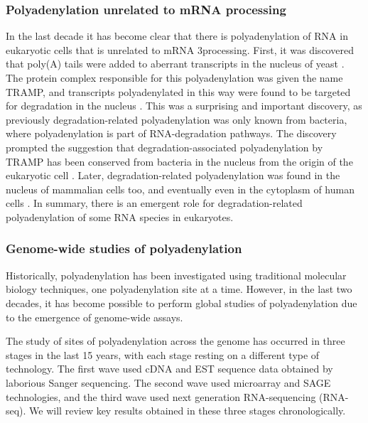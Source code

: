 \subsubsection{Polyadenylation unrelated to mRNA processing}
In the last decade it has become clear that there is polyadenylation of RNA in
eukaryotic cells that is unrelated to mRNA 3\ppp processing. First, it was
discovered that poly(A) tails were added to aberrant transcripts in the nucleus
of yeast \cite{wyers_cryptic_2005}. The protein complex responsible for this
polyadenylation was given the name TRAMP, and transcripts polyadenylated in
this way were found to be targeted for degradation in the nucleus
\cite{lacava_rna_2005, wyers_cryptic_2005}. This was a surprising and important
discovery, as previously degradation-related polyadenylation was only known
from bacteria, where polyadenylation is part of RNA-degradation pathways. The
discovery prompted the suggestion that degradation-associated polyadenylation
by TRAMP has been conserved from bacteria in the nucleus from the origin of the
eukaryotic cell \cite{lacava_rna_2005}. Later, degradation-related
polyadenylation was found in the nucleus of mammalian cells too, and eventually
even in the cytoplasm of human cells \cite{slomovic_polyadenylation_2006,
slomovic_addition_2010}. In summary, there is an emergent role for
degradation-related polyadenylation of some RNA species in eukaryotes.

\subsubsection{Genome-wide studies of polyadenylation}
Historically, polyadenylation has been investigated using traditional molecular
biology techniques, one polyadenylation site at a time. However, in the last two
decades, it has become possible to perform global studies of polyadenylation
due to the emergence of genome-wide assays.

The study of sites of polyadenylation across the genome has occurred in three
stages in the last 15 years, with each stage resting on a different type of
technology. The first wave used cDNA and EST sequence data obtained by
laborious Sanger sequencing. The second wave used microarray and SAGE
technologies, and the third wave used next generation RNA-sequencing (RNA-seq).
We will review key results obtained in these three stages chronologically.

